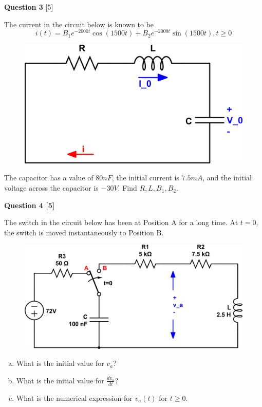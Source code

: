 \documentclass[12pt]{article}
\begin{document}
\newpage

{\bf Question 3} [5] %

The current in the circuit below is known to be
\begin{equation}
i(t) = B_1 e^{-2000t} \cos{(1500t)} + B_2 e^{-2000t} \sin{(1500t)}, t \geq 0 
\end{equation}
\begin{figure}[h!]
\begin{center}
 \includegraphics[scale=0.4]{fig8_3.png}
\end{center}
\end{figure}

The capacitor has a value of $80 nF$, the initial current is $7.5mA$, and the initial voltage across the capacitor is $-30V$. Find $R, L, B_1, B_2$.

\vspace{0.5cm}

{\bf Question 4 [5]} %

The switch in the circuit below has been at Position A for a long time. At $ t = 0$, the switch is moved instantaneously to Position B. 

\begin{figure}[h!]
\begin{center}
 \includegraphics[scale=0.6]{fig8_46.png}
\end{center}
\end{figure}

\begin{enumerate}[(a)]
\item What is the initial value for $v_a$?
\item What is the initial value for $\frac{dv_a}{dt}$?
\item What is the numerical expression for $v_a(t)$ for $t \geq 0$.
\end{enumerate}
\end{document}
